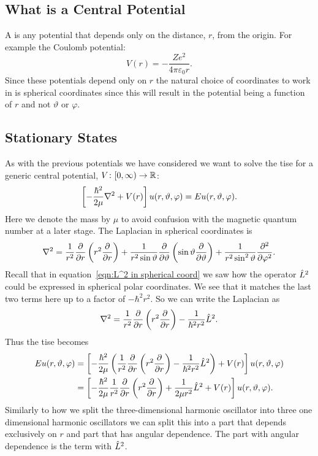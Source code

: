 \subsection{What is a Central Potential}
A  is any potential that depends only on the distance, \(r\), from the origin.
For example the Coulomb potential:
\[V(r) = -\frac{Ze^2}{4\pi\varepsilon_0 r}.\]
Since these potentials depend only on \(r\) the natural choice of coordinates to work in is spherical coordinates since this will result in the potential being a function of \(r\) and not \(\vartheta\) or \(\varphi\).

\subsection{Stationary States}\label{sec:stationary states central potentials}
As with the previous potentials we have considered we want to solve the \gls{tise} for a generic central potential, \(V\colon[0, \infty)\to\mathbb{R}\):
\[\left[-\frac{\hbar^2}{2\mu}\nabla^2 + V(r)\right]u(r, \vartheta, \varphi) = Eu(r, \vartheta, \varphi).\]
Here we denote the mass by \(\mu\) to avoid confusion with the magnetic quantum number at a later stage.
The Laplacian in spherical coordinates is
\[\nabla^2 = \frac{1}{r^2}\pdv{r}\left(r^2\pdv{r}\right) + \frac{1}{r^2\sin\vartheta}\pdv{\vartheta}\left(\sin\vartheta\pdv{\vartheta}\right) + \frac{1}{r^2\sin^2\vartheta}\pdv[2]{\varphi}.\]
Recall that in equation~\ref{eqn:L^2 in spherical coord} we saw how the operator \(\hat{L}^2\) could be expressed in spherical polar coordinates. 
We see that it matches the last two terms here up to a factor of \(-\hbar^2r^2\).
So we can write the Laplacian as
\[\nabla^2 = \frac{1}{r^2}\pdv{r}\left(r^2\pdv{r}\right) - \frac{1}{\hbar^2 r^2}\hat{L}^2.\]
Thus the \gls{tise} becomes
\begin{align*}
    Eu(r, \vartheta, \varphi) &= \left[-\frac{\hbar^2}{2\mu} \left(\frac{1}{r^2}\pdv{r} \left(r^2\pdv{r}\right) - \frac{1}{\hbar^2r^2} \hat{L}^2\right) + V(r)\right]u(r, \vartheta, \varphi)\\
    &= \left[-\frac{\hbar^2}{2\mu}\frac{1}{r^2} \pdv{r}\left(r^2\pdv{r}\right) + \frac{1}{2\mu r^2}\hat{L}^2 + V(r)\right]u(r, \vartheta, \varphi).
\end{align*}
Similarly to how we split the three-dimensional harmonic oscillator into three one dimensional harmonic oscillators we can split this into a part that depends exclusively on \(r\) and part that has angular dependence.
The part with angular dependence is the term with \(\hat{L}^2\).

